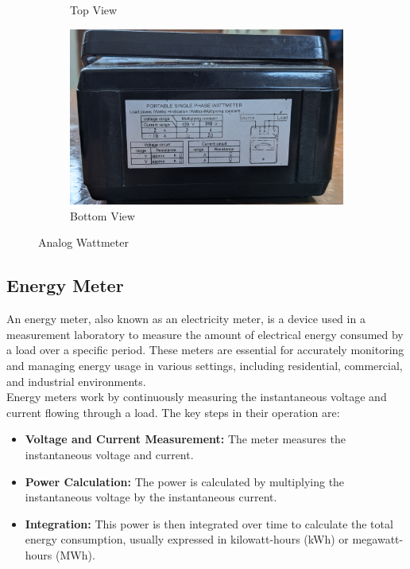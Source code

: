 \documentclass[a4paper,12pt]{article}
\begin{document}
\begin{figure}[H]
\begin{subfigure}[t]{0.33\textwidth}
			\caption{Top View}
		\end{subfigure}
		\hfill
		\begin{subfigure}[t]{0.32\textwidth}
			\centering
			\includegraphics[width=1\linewidth]{Images/21}
			\caption{Bottom View}
		\end{subfigure}
		
		\caption{Analog Wattmeter }
		\label{fig:5}
	\end{figure}
	\newpage
	\subsection{Energy Meter}
	An energy meter, also known as an electricity meter, is a device used in a measurement laboratory to measure the amount of electrical energy consumed by a load over a specific period. These meters are essential for accurately monitoring and managing energy usage in various settings, including residential, commercial, and industrial environments.\\
	Energy meters work by continuously measuring the instantaneous voltage and current flowing through a load. The key steps in their operation are:
	\begin{itemize}
		\item \textbf{Voltage and Current Measurement:} The meter measures the instantaneous voltage and current.
		\item \textbf{Power Calculation:} The power is calculated by multiplying the instantaneous voltage by the instantaneous current.
		\item \textbf{Integration:} This power is then integrated over time to calculate the total energy consumption, usually expressed in kilowatt-hours (kWh) or megawatt-hours (MWh).
	\end{itemize}
	
\end{document}
